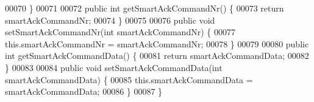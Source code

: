 \begin{DoxyCode}
00070     \}
00071 
00072     \textcolor{keyword}{public} \textcolor{keywordtype}{int} getSmartAckCommandNr() \{
00073         \textcolor{keywordflow}{return} smartAckCommandNr;
00074     \}
00075 
00076     \textcolor{keyword}{public} \textcolor{keywordtype}{void} setSmartAckCommandNr(\textcolor{keywordtype}{int} smartAckCommandNr) \{
00077         this.smartAckCommandNr = smartAckCommandNr;
00078     \}
00079 
00080     \textcolor{keyword}{public} \textcolor{keywordtype}{int} getSmartAckCommandData() \{
00081         \textcolor{keywordflow}{return} smartAckCommandData;
00082     \}
00083 
00084     \textcolor{keyword}{public} \textcolor{keywordtype}{void} setSmartAckCommandData(\textcolor{keywordtype}{int} smartAckCommandData) \{
00085         this.smartAckCommandData = smartAckCommandData;
00086     \}
00087 \}
\end{DoxyCode}
